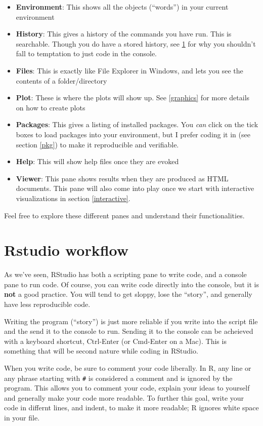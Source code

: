 \documentclass[12pt,letterpaperpaper,openany]{book}
\providecommand{\tightlist}{%
  \setlength{\itemsep}{0pt}\setlength{\parskip}{0pt}}
\begin{document}
\begin{itemize}
\tightlist
\item
  \textbf{Environment}: This shows all the objects (``words'') in your current environment
\item
  \textbf{History}: This gives a history of the commands you have run. This is searchable. Though
  you do have a stored history, see \ref{workflow} for why you shouldn't fall to temptation to
  just code in the console.
\item
  \textbf{Files}: This is exactly like File Explorer in Windows, and lets you see the contents of
  a folder/directory
\item
  \textbf{Plot}: These is where the plots will show up. See \ref{graphics} for more details on how to create plots
\item
  \textbf{Packages}: This gives a listing of installed packages. You \emph{can} click on the tick boxes to
  load packages into your environment, but I prefer coding it in (see section \ref{pkg}) to make it
  reproducible and verifiable.
\item
  \textbf{Help}: This will show help files once they are evoked
\item
  \textbf{Viewer}: This pane shows results when they are produced as HTML documents. This pane
  will also come into play once we start with interactive visualizations in section \ref{interactive}.
\end{itemize}

Feel free to explore these different panes and understand their functionalities.

\hypertarget{workflow}{%
\section{Rstudio workflow}\label{workflow}}

As we've seen, RStudio has both a scripting pane to write code, and a console pane to run code. Of course, you can write code directly into the console, but it is \textbf{not} a good practice. You will tend to get sloppy, lose the ``story'', and generally have less reproducible code.

Writing the program (``story'') is just more reliable if you write into the script file and the send it to the console to run. Sending it to the console can be acheieved with a keyboard shortcut, Ctrl-Enter (or Cmd-Enter on a Mac). This is something that will be second nature while coding in RStudio.

When you write code, be sure to comment your code liberally. In R, any line or any phrase starting with \texttt{\#} is considered a comment and is ignored by the program. This allows you to comment your code, explain your ideas to yourself and generally make your code more readable. To further this goal, write your code in differnt lines, and indent, to make it more readable; R ignores white space in your file.
\end{document}
